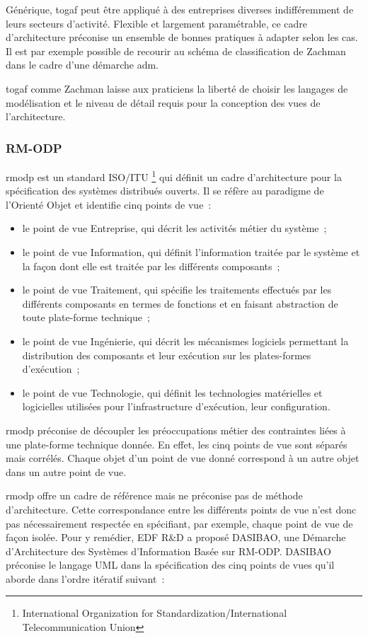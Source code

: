 Générique, \gls{togaf} peut être appliqué à des entreprises diverses
indifféremment de leurs secteurs d'activité. Flexible et largement paramétrable, ce cadre d'architecture préconise un ensemble de bonnes pratiques à adapter selon les cas. Il est par exemple possible de recourir au schéma de classification de Zachman dans le
cadre d'une démarche \gls{adm}.

\gls{togaf} comme Zachman laisse aux praticiens la liberté de choisir les langages de
modélisation et le niveau de détail requis pour la conception des vues de
l'architecture. 

\subsubsection{RM-ODP}
\gls{rmodp} est un standard ISO/ITU \footnote{International Organization for Standardization/International Telecommunication Union} qui définit un cadre d'architecture pour la spécification des systèmes distribués ouverts.
Il se réfère au paradigme de l'Orienté Objet et identifie cinq points de vue~:
\begin{itemize}
\item le point de vue Entreprise, qui décrit les activités métier du système~;
\item le point de vue Information, qui définit l'information traitée par le système et la
façon dont elle est traitée par les différents composants~;
\item le point de vue Traitement, qui spécifie les traitements effectués
par les différents composants en termes de fonctions et en faisant abstraction de toute plate-forme technique~;
\item le point de vue Ingénierie, qui décrit les mécanismes logiciels permettant la
distribution des composants et leur exécution sur les plates-formes d'exécution~;
\item le point de vue Technologie, qui définit les technologies matérielles et logicielles
utilisées pour l'infrastructure d'exécution, leur configuration.
\end{itemize}

\gls{rmodp} préconise de découpler les préoccupations métier des
contraintes liées à une plate-forme technique donnée. En effet, les cinq points de vue sont séparés mais corrélés. Chaque objet d'un point de vue donné correspond à un autre objet dans un autre point de vue.

\gls{rmodp} offre un cadre de référence mais ne préconise pas de méthode d'architecture. Cette correspondance entre les différents points de vue n'est donc pas nécessairement respectée en spécifiant, par exemple, chaque point de vue de façon isolée.
Pour y remédier, EDF R\&D a proposé DASIBAO, une Démarche d’Architecture des
Systèmes d’Information Basée sur RM-ODP. DASIBAO préconise le langage UML dans la
spécification des cinq points de vues qu'il aborde dans l'ordre itératif suivant~:

